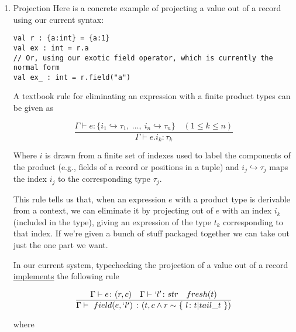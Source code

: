 \documentclass[11pt]{article}
\begin{document}
\begin{enumerate}
\item Projection
\label{sec:org6c8b9ea}
Here is a concrete example of projecting a value out of a record using
our current syntax:

\begin{verbatim}
val r : {a:int} = {a:1}
val ex : int = r.a
// Or, using our exotic field operator, which is currently the normal form
val ex_ : int = r.field("a")
\end{verbatim}

A textbook rule for eliminating an expression with a finite product
types can be given as

$$
\frac
{ \Gamma \vdash e \colon \{ i_1 \hookrightarrow \tau_1, \ \ldots, \ i_n \hookrightarrow \tau_n \} \quad (1 \le k \le n)}
{ \Gamma \vdash e.i_k \colon \tau_k }
$$

Where \(i\) is drawn from a finite set of indexes used to label the
components of the product (e.g., fields of a record or positions in a
tuple) and \(i_j \hookrightarrow \tau_j\) maps the index \(i_j\) to the
corresponding type \(\tau_j\).

This rule tells us that, when an expression \(e\) with a product type is
derivable from a context, we can eliminate it by projecting out of \(e\)
with an index \(i_k\) (included in the type), giving an expression of
the type \(t_k\) corresponding to that index. If we're given a bunch of
stuff packaged together we can take out just the one part we want.

In our current system, typechecking the projection of a value out of a record
\href{https://github.com/informalsystems/quint/blob/545b14fb8c19ac71d8f08fb8500ce9cc3cabf678/quint/src/types/specialConstraints.ts\#L91-L120}{implements} the following rule

$$
\frac
{ \Gamma \vdash e \colon (r, c) \quad \Gamma \vdash `l' \colon str \quad fresh(t) }
{ \Gamma \vdash \ field(e, `l') \ \colon (t, c \land r \sim \{ \ l \colon t | tail\_t \ \}) }
$$

where


\end{enumerate}
\end{document}
